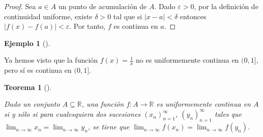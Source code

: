 \documentclass[
  a4paper,
]{scrreport}
\theoremstyle{plain}
\newtheorem{theorem}{Teorema}[chapter]
\theoremstyle{definition}
\theoremstyle{plain}
\theoremstyle{plain}
\theoremstyle{definition}
\newtheorem{example}{Ejemplo}[chapter]
\theoremstyle{definition}
\theoremstyle{remark}
\begin{document}
\begin{tcolorbox}[enhanced jigsaw, titlerule=0mm, arc=.35mm, colframe=quarto-callout-note-color-frame, bottomrule=.15mm, opacitybacktitle=0.6, rightrule=.15mm, coltitle=black, colback=white, toprule=.15mm, title=\textcolor{quarto-callout-note-color}{\faInfo}\hspace{0.5em}{Demostración}, leftrule=.75mm, bottomtitle=1mm, opacityback=0, breakable, colbacktitle=quarto-callout-note-color!10!white, toptitle=1mm, left=2mm]

\begin{proof}
Sea \(a\in A\) un punto de acumulación de \(A\). Dado \(\varepsilon>0\),
por la definición de continuidad uniforme, existe \(\delta>0\) tal que
si \(|x-a|<\delta\) entonces \(|f(x)-f(a)|<\varepsilon\). Por tanto,
\(f\) es continua en \(a\).
\end{proof}

\end{tcolorbox}

\begin{example}[]\protect\hypertarget{exm-funcion-no-uniformemente-continua}{}\label{exm-funcion-no-uniformemente-continua}

Ya hemos visto que la función \(f(x)=\frac{1}{x}\) no es uniformemente
continua en \((0,1]\), pero sí es continua en \((0,1]\).

\end{example}

\begin{theorem}[]\protect\hypertarget{thm-continuidad-uniforme-sucesiones}{}\label{thm-continuidad-uniforme-sucesiones}

Dado un conjunto \(A\subseteq \mathbb{R}\), una función
\(f:A\to \mathbb{R}\) es uniformemente continua en \(A\) si y sólo si
para cualesquiera dos sucesiones \((x_n)_{n=1}^\infty\),
\((y_n)_{n=1}^\infty\) tales que
\(\lim_{n\to\infty}x_n=\lim_{n\to\infty}y_n\), se tiene que
\(\lim_{n\to\infty}f(x_n)=\lim_{n\to\infty}f(y_n)\).

\end{theorem}
\end{document}

